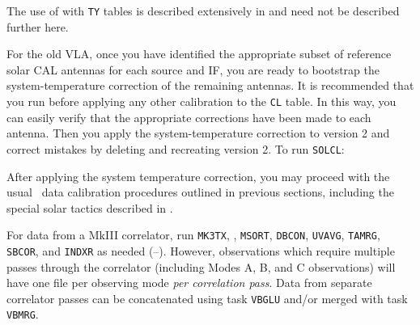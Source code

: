      The use of {\tt {}} with {\tt TY} tables is described
extensively in  and need not be described further here.


     For the old VLA, once you have identified the appropriate subset
of reference solar CAL antennas for each source and IF, you are ready
to bootstrap the system-temperature correction of the remaining
antennas.  It is recommended that you run {\tt {}} before
applying any other calibration to the {\tt CL} table.  In this way,
you can easily verify that the appropriate corrections have been made
to each antenna.  Then you apply the system-temperature correction to
version 2 and correct mistakes by deleting and recreating version 2.
To run {\tt SOLCL}:

     After applying the system temperature correction, you may proceed
with the usual \AIPS\ data calibration procedures outlined in previous
sections, including the special solar tactics described in
.


For data from a MkIII correlator, run {\tt MK3TX}, {\tt {}},
{\tt MSORT}, {\tt DBCON}, {\tt UVAVG}, {\tt TAMRG}, {\tt SBCOR}, and
{\tt INDXR} as needed (--).   However,
observations which require multiple passes through the correlator
(including  Modes A, B, and C observations) will have one
file per observing mode {\it per correlation pass\/}.  Data from
separate correlator passes can be concatenated using task {\tt VBGLU}
and/or merged with task {\tt VBMRG}\@.




